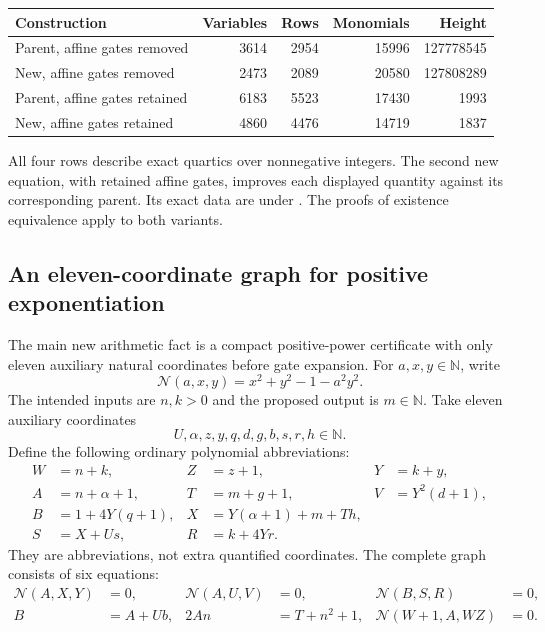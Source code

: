 \begin{center}
\begin{tabular}{lrrrr}
\hline
Construction & Variables & Rows & Monomials & Height\\
\hline
Parent, affine gates removed & 3614 & 2954 & 15996 & 127778545\\
New, affine gates removed & 2473 & 2089 & 20580 & 127808289\\
Parent, affine gates retained & 6183 & 5523 & 17430 & 1993\\
New, affine gates retained & 4860 & 4476 & 14719 & 1837\\
\hline
\end{tabular}
\end{center}
All four rows describe exact quartics over nonnegative integers. The second
new equation, with retained affine gates, improves each displayed quantity
against its corresponding parent. Its exact data are under
. The proofs of existence equivalence apply to
both variants.

\subsection{An eleven-coordinate graph for positive exponentiation}

The main new arithmetic fact is a compact positive-power certificate with
only eleven auxiliary natural coordinates before gate expansion. For
$a,x,y\in\mathbb N$, write
\[
 \mathcal N(a,x,y)=x^2+y^2-1-a^2y^2.
\]
The intended inputs are $n,k>0$ and the proposed output is $m\in\mathbb N$.
Take eleven auxiliary coordinates
\[
 U,\alpha,z,y,q,d,g,b,s,r,h\in\mathbb N.
\]
Define the following ordinary polynomial abbreviations:
\begin{align*}
 W&=n+k,& Z&=z+1,&Y&=k+y,\\
 A&=n+\alpha+1,&T&=m+g+1,&V&=Y^2(d+1),\\
 B&=1+4Y(q+1),&
 X&=Y(\alpha+1)+m+Th,\\
 S&=X+Us,&R&=k+4Yr.
\end{align*}
They are abbreviations, not extra quantified coordinates. The complete
graph consists of six equations:
\begin{align}
 \mathcal N(A,X,Y)&=0,&\mathcal N(A,U,V)&=0,
       &\mathcal N(B,S,R)&=0,\label{eq:op-norms}\\
 B&=A+Ub,&2An&=T+n^2+1,
       &\mathcal N(W+1,A,WZ)&=0.\label{eq:op-rest}
\end{align}


